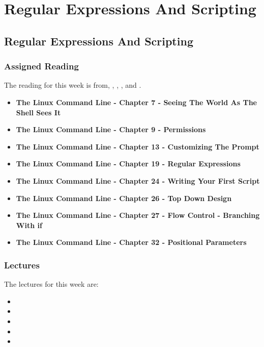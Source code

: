 \clearpage

\renewcommand{\ChapTitle}{Regular Expressions And Scripting}
\renewcommand{\SectionTitle}{Regular Expressions And Scripting}

\chapter{\ChapTitle}

\section{\SectionTitle}

\subsection{Assigned Reading}

The reading for this week is from, \AgileBook, \EngSoftBook, \ProGitBook, and \LinuxBook.

\begin{itemize}
    \item \textbf{The Linux Command Line - Chapter 7 - Seeing The World As The Shell Sees It}
    \item \textbf{The Linux Command Line - Chapter 9 - Permissions}
    \item \textbf{The Linux Command Line - Chapter 13 - Customizing The Prompt}
    \item \textbf{The Linux Command Line - Chapter 19 - Regular Expressions}
    \item \textbf{The Linux Command Line - Chapter 24 - Writing Your First Script}
    \item \textbf{The Linux Command Line - Chapter 26 - Top Down Design}
    \item \textbf{The Linux Command Line - Chapter 27 - Flow Control - Branching With if}
    \item \textbf{The Linux Command Line - Chapter 32 - Positional Parameters}
\end{itemize}

\subsection{Lectures}

The lectures for this week are:

\begin{itemize}
    \item {}
    \item {}
    \item {}
    \item {}
    \item {}
\end{itemize}


